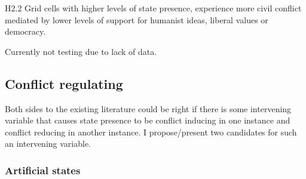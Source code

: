 \documentclass[12pt]{article}
\begin{document}
H2.2 Grid cells with higher levels of state presence, experience more civil
conflict mediated by lower levels of support for humanist ideas, liberal
values or democracy.

Currently not testing due to lack of data.

\subsection{Conflict regulating}

Both sides to the existing literature could be right if there is some
intervening variable that causes state presence to be conflict inducing in one
instance and conflict reducing in another instance. I propose/present two
candidates for such an intervening variable.

\subsubsection{Artificial states}
\end{document}
